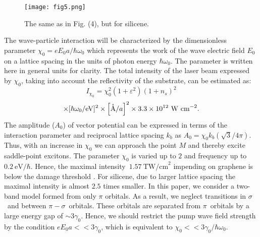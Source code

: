 \documentclass[reprint, superscriptaddress,  aps, pra]{revtex4-2}
\begin{document}
\begin{figure}[tbp]
\texttt{[image: fig5.png]}
\caption{The same as in Fig. (4), but for silicene.}
\end{figure}

The wave-particle interaction will be characterized by the dimensionless
parameter $\chi _{0}=eE_{0}a/\hbar \omega _{0}$ which represents the work of
the wave electric field $E_{0}$ on a lattice spacing in the units of photon
energy $\hbar \omega _{0}$. The parameter is written here in general units
for clarity. The total intensity of the laser beam expressed by $\chi _{0}$,
taking into account the reflectivity of the substrate, can be estimated as:%
\begin{equation*}
I_{\chi _{0}}=\chi _{0}^{2}\left( 1+\varepsilon ^{2}\right) \left(
1+n_{s}\right) ^{2}
\end{equation*}%
\begin{equation}
\times \lbrack \hbar \omega _{0}/\mathrm{eV}]^{2}\times \left[ \mathrm{%
\mathring{A}}/a\right] ^{2}\times 3.3\times 10^{12}\ \mathrm{W\ cm}^{-2}.
\label{int}
\end{equation}%
The amplitude ($A_{0}$) of vector potential can be expressed in terms of the
interaction parameter and reciprocal lattice spacing $k_{b}$ as $A_{0}=\chi
_{0}k_{b}\left( \sqrt{3}/4\pi \right) $. Thus, with an increase in $\chi _{0}
$ we can approach the point $M$ and thereby excite saddle-point excitons.
The parameter $\chi _{0}$ is varied up to $2$ and frequency up to $0.2\ 
\mathrm{eV}/\hbar $. Hence, the maximal intensity $\,\allowbreak 1.57\ 
\mathrm{TW/cm}^{2}$ impending on graphene is below the damage threshold \cite%
{Yoshikawa}. For silicene, due to larger lattice spacing the maximal
intensity is almost $2.5$ times smaller. In this paper, we consider a
two-band model formed from only $\pi $ orbitals. As a result, we neglect
transitions in $\sigma $\ and between $\pi -\sigma $\ orbitals. These
orbitals are separated from $\pi $\ orbitals by a large energy gap of $\sim
3\gamma _{0}$. Hence, we should restrict the pump wave field strength by the
condition $eE_{0}a<<3\gamma _{0}$, which is equivalent to $\chi
_{0}<<3\gamma _{0}/\hbar \omega _{0}$.
\end{document}
